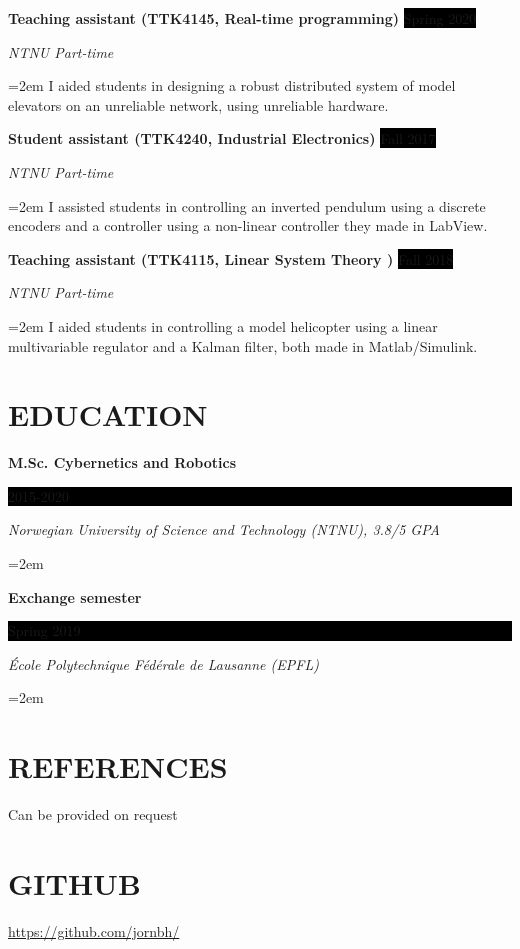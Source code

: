 \documentclass[paper=a4,fontsize=11pt,norsk]{scrartcl} %
\newlength{\spacebox}
\newcommand{\NewPart}[1]{\section*{\uppercase{#1}}}
\newcommand{\PersonalEntry}[2]{
		\noindent\hangindent=2em\hangafter=0 %
		\parbox{\spacebox}{        %
		\textit{#1}}		       %
		\hspace{1.5em} #2 \par}    %
\newcommand{\EducationEntry}[4]{
		\noindent \textbf{#1} \hfill      %
		\colorbox{Black}{%
			\parbox{6em}{%
			\hfill\color{White}#2}} \par  %
		\noindent \textit{#3} \par        %
		\noindent\hangindent=2em\hangafter=0 \small #4 %
		\normalsize \par}
\newcommand{\WorkEntry}[4]{				  %
		\noindent \textbf{#1} \hfill      %
		\colorbox{Black}{\color{White}#2} \par  %
		\noindent \textit{#3} \par              %
		\noindent\hangindent=2em\hangafter=0 \small #4 %
		\normalsize \par}
\begin{document}

\WorkEntry{Teaching assistant (TTK4145, Real-time programming)}{Spring 2020}{NTNU Part-time}
{I aided students in designing a robust distributed system of model elevators on an unreliable network, using unreliable hardware.}



\WorkEntry{Student assistant (TTK4240, Industrial Electronics)}{Fall 2017}{NTNU Part-time}
{
	I assisted students in controlling an inverted pendulum using a discrete encoders and a controller using a non-linear controller they made in LabView. 
}

\WorkEntry{Teaching assistant (TTK4115, Linear System Theory )}{Fall 2018}{NTNU Part-time}
{
	I aided students in controlling a model helicopter using a linear multivariable regulator and a Kalman filter, both made in Matlab/Simulink.
}


\NewPart{Education}{}

\EducationEntry{M.Sc. Cybernetics and Robotics}{2015-2020}{Norwegian University of Science and Technology (NTNU), 3.8/5 GPA}{}
\EducationEntry{Exchange semester}{Spring 2019}{École Polytechnique Fédérale de Lausanne (EPFL)}{}





\NewPart{References}{}
Can be provided on request



\NewPart{GitHub}{
\url{https://github.com/jornbh/}
}
\end{document}
